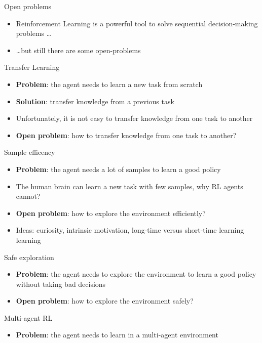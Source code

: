 \documentclass[presentation, 9pt]{beamer}\mode<presentation>{\usetheme{AMSBolognaFC}}
\begin{document}
\begin{frame}[allowframebreaks]{Open problems}
	\begin{itemize}
		\item Reinforcement Learning is a powerful tool to solve sequential decision-making problems \dots
		\item \dots but still there are some open-problems
	\end{itemize}
	\begin{exampleblock}{Transfer Learning}
		\begin{itemize}
			\item \textbf{Problem}: the agent needs to learn a new task from scratch
			\item \textbf{Solution}: transfer knowledge from a previous task
			\item Unfortunately, it is not easy to transfer knowledge from one task to another
			\item \textbf{Open problem}: how to transfer knowledge from one task to another?
		\end{itemize}
	\end{exampleblock}
	\begin{exampleblock}{Sample efficency}
		\begin{itemize}
			\item \textbf{Problem}: the agent needs a lot of samples to learn a good policy
			\item The human brain can learn a new task with few samples, why RL agents cannot?
			\item \textbf{Open problem}: how to explore the environment efficiently?
			\item Ideas: curiosity, intrinsic motivation, long-time versus short-time learning learning
		\end{itemize}
	\end{exampleblock}
	\begin{exampleblock}{Safe exploration}
		\begin{itemize}
			\item \textbf{Problem}: the agent needs to explore the environment to learn a good policy without taking bad decisions
			\item \textbf{Open problem}: how to explore the environment safely?
		\end{itemize}		
	\end{exampleblock}
	\begin{exampleblock}{Multi-agent RL}
		\begin{itemize}
			\item \textbf{Problem}: the agent needs to learn in a multi-agent environment

\end{itemize}
\end{exampleblock}
\end{frame}
\end{document}
